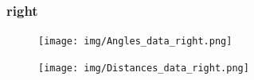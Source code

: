 \documentclass{scrartcl}
\begin{document}

\subsubsection{right}

\begin{figure}[H]
\centering
\begin{minipage}{.5\textwidth}
  \centering
  \texttt{[image: img/Angles\_data\_right.png]}
\end{minipage}%
\begin{minipage}{.5\textwidth}
  \centering
  \texttt{[image: img/Distances\_data\_right.png]}
\end{minipage}
\end{figure}









%



%
\end{document}
